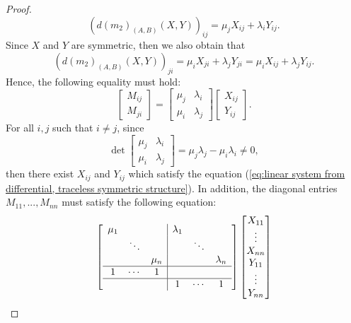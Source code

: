 \documentclass[reqno]{amsart}
\theoremstyle{definition}
\numberwithin{equation}{section}
\begin{document}
\begin{proof}
\begin{equation*}
        (d(m_2)_{(A,B)}(X,Y))_{ij}=\mu_jX_{ij}+\lambda_iY_{ij}.
    \end{equation*}
    Since $X$ and $Y$ are symmetric, then we also obtain that 
    \begin{equation*}
        (d(m_2)_{(A,B)}(X,Y))_{ji}=\mu_iX_{ji}+\lambda_jY_{ji}=\mu_iX_{ij}+\lambda_jY_{ij}.
    \end{equation*}
    Hence, the following equality must hold:
    \begin{equation}\label{eq:linear system from differential, traceless symmetric structure}
        \begin{bmatrix}
            M_{ij}\\
            M_{ji}
        \end{bmatrix}=\begin{bmatrix}
            \mu_j & \lambda_i\\
            \mu_i & \lambda_j
        \end{bmatrix}\begin{bmatrix}
            X_{ij}\\ Y_{ij}
        \end{bmatrix}.
    \end{equation}
    For all $i,j$ such that $i \neq j$, since 
    \begin{equation*}
        \det \begin{bmatrix}
            \mu_j & \lambda_i\\
            \mu_i & \lambda_j
        \end{bmatrix} = \mu_j\lambda_j-\mu_i\lambda_i \neq 0,
    \end{equation*}
    then there exist $X_{ij}$ and $Y_{ij}$ which satisfy the equation (\ref{eq:linear system from differential, traceless symmetric structure}). In addition, the diagonal entries $M_{11},...,M_{nn}$ must satisfy the following equation:
    \begin{equation*}
        \left[\begin{array}{ccc|ccc}
             \mu_1 & & & \lambda_1 & & \\
             & \ddots &  & & \ddots & \\
             & & \mu_n & & & \lambda_n \\ \hline
             1 & \cdots & 1 & & &\\ \hline
             & & & 1 & \cdots & 1
        \end{array}\right]\begin{bmatrix}
            X_{11} \\ \vdots \\ X_{nn} \\ Y_{11} \\ \vdots \\ Y_{nn}

\end{bmatrix}
\end{equation*}
\end{proof}
\end{document}

